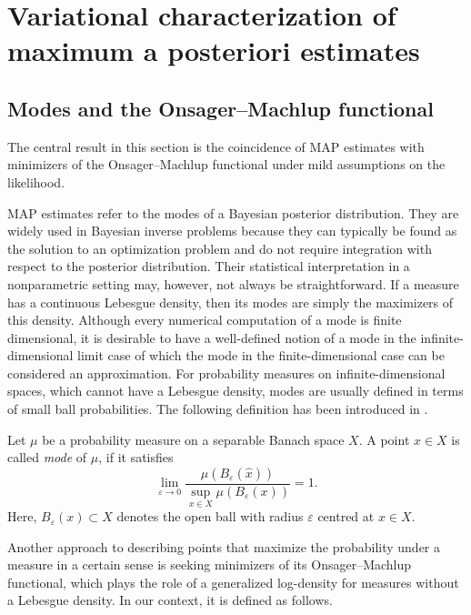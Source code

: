 \documentclass[english]{jnsao}
\theoremstyle{definition}
\begin{document}

\section{Variational characterization of maximum a posteriori estimates}
\label{sect_var_char}

\subsection{Modes and the Onsager--Machlup functional}

The central result in this section is the coincidence of MAP estimates with minimizers of the Onsager--Machlup functional under mild assumptions on the likelihood.

MAP estimates refer to the modes of a Bayesian posterior distribution.
They are widely used in Bayesian inverse problems because they can typically be found as the solution to an optimization problem and do not require integration with respect to the posterior distribution. Their statistical interpretation in a nonparametric setting may, however, not always be straightforward.
If a measure has a continuous Lebesgue density, then its modes are simply the maximizers of this density. 
Although every numerical computation of a mode is finite dimensional, it is desirable to have a well-defined notion of a mode in the infinite-dimensional limit case of which the mode in the finite-dimensional case can be considered an approximation.
For probability measures on infinite-dimensional spaces, which cannot have a Lebesgue density, modes are usually defined in terms of small ball probabilities.
The following definition has been introduced in \cite{Dashti:2013}.

\begin{definition}
	\label{def_mode}
	Let $\mu$ be a probability measure on a separable Banach space $X$.
	A point $\hat{x} \in X$ is called \emph{mode} of $\mu$, if it satisfies
	\begin{equation}
		\lim_{\varepsilon \to 0} \frac{\mu(B_\varepsilon(\hat{x}))}{\sup_{x \in X} \mu(B_\varepsilon(x))} = 1.
	\end{equation}
	Here, $B_\varepsilon(x) \subset X$ denotes the open ball with radius $\varepsilon$ centred at $x \in X$.
\end{definition}

Another approach to describing points that maximize the probability under a measure in a certain sense is seeking minimizers of its Onsager--Machlup functional, which plays the role of a generalized log-density for measures without a Lebesgue density. In our context, it is defined as follows.
\end{document}
